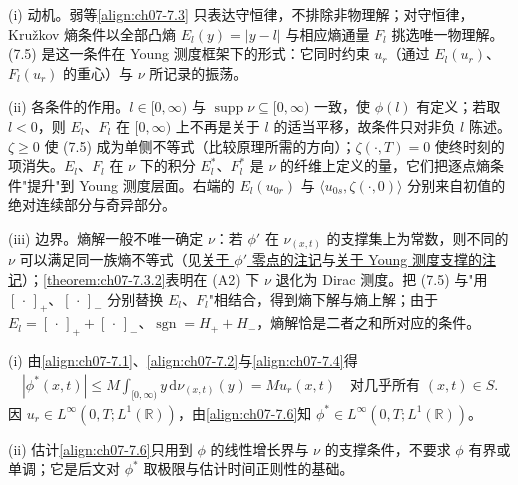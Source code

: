 ﻿\documentclass[../../main.tex]{subfiles}%
\begin{document}
\begin{remark}\label{remark:ch07-young熵解动机}
(i) 动机。弱等\eqref{align:ch07-7.3} 只表达守恒律，不排除非物理解；对守恒律，Kružkov 熵条件以全部凸熵 $E_l(y)=|y-l|$ 与相应熵通量 $F_l$ 挑选唯一物理解。(7.5) 是这一条件在 Young 测度框架下的形式：它同时约束 $u_r$（通过 $E_l(u_r)$、$F_l(u_r)$ 的重心）与 $\nu$ 所记录的振荡。

(ii) 各条件的作用。$l\in[0,\infty)$ 与 $\operatorname{supp}\nu\subseteq[0,\infty)$ 一致，使 $\phi(l)$ 有定义；若取 $l<0$，则 $E_l$、$F_l$ 在 $[0,\infty)$ 上不再是关于 $l$ 的适当平移，故条件只对非负 $l$ 陈述。$\zeta\geqslant0$ 使 (7.5) 成为单侧不等式（比较原理所需的方向）；$\zeta(\cdot,T)=0$ 使终时刻的项消失。$E_l$、$F_l$ 在 $\nu$ 下的积分 $E_l^*$、$F_l^*$ 是 $\nu$ 的纤维上定义的量，它们把逐点熵条件"提升"到 Young 测度层面。右端的 $E_l(u_{0r})$ 与 $\langle u_{0s},\zeta(\cdot,0)\rangle$ 分别来自初值的绝对连续部分与奇异部分。

(iii) 边界。熵解一般不唯一确定 $\nu$：若 $\phi'$ 在 $\nu_{(x,t)}$ 的支撑集上为常数，则不同的 $\nu$ 可以满足同一族熵不等式（见\hyperref[remark:ch07-7.5.2]{关于 $\phi'$ 零点的注记}与\hyperref[remark:ch07-7.5.3]{关于 Young 测度支撑的注记}）；\cref{theorem:ch07-7.3.2}表明在 (A2) 下 $\nu$ 退化为 Dirac 测度。把 (7.5) 与"用 $[\,\cdot\,]_+$、$[\,\cdot\,]_-$ 分别替换 $E_l$、$F_l$"相结合，得到熵下解与熵上解；由于 $E_l=[\,\cdot\,]_++[\,\cdot\,]_-$、$\operatorname{sgn}=H_++H_-$，熵解恰是二者之和所对应的条件。
\end{remark}

\begin{remark}\label{remark:ch07-7.1.2}
(i) 由\eqref{align:ch07-7.1}、\eqref{align:ch07-7.2}与\eqref{align:ch07-7.4}得
\begin{align}
|\phi^*(x,t)|\leqslant M\int_{[0,\infty)}y\,\mathrm{d}\nu_{(x,t)}(y)=Mu_r(x,t)
\quad\text{对几乎所有 }(x,t)\in S. \label{align:ch07-7.6}
\end{align}
因 $u_r\in L^\infty(0,T;L^1(\mathbb{R}))$，由\eqref{align:ch07-7.6}知 $\phi^*\in L^\infty(0,T;L^1(\mathbb{R}))$。

(ii) 估计\eqref{align:ch07-7.6}只用到 $\phi$ 的线性增长界与 $\nu$ 的支撑条件，不要求 $\phi$ 有界或单调；它是后文对 $\phi^*$ 取极限与估计时间正则性的基础。
\end{remark}
\end{document}
